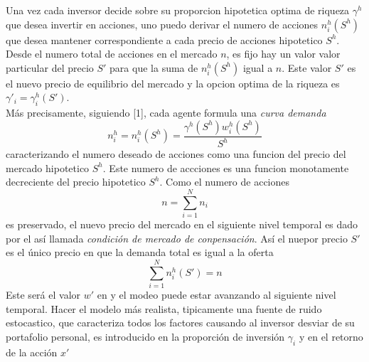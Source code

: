 \documentclass[12pt]{article}
\begin{document}
\quad Una vez cada inversor decide sobre su proporcion hipotetica optima de riqueza $\gamma^{h}$ que desea invertir en acciones, uno puedo derivar el numero de acciones $n^{h}_i(S^{h})$ que desea mantener correspondiente a cada precio de acciones hipotetico $S^{h}$. Desde el numero total de acciones en el mercado $n$, es fijo hay un valor valor particular del precio $S'$ para que la suma de $n^{h}_i(S^h)$ igual a $n$. Este valor $S'$ es el nuevo precio de equilibrio del mercado y la opcion optima de la riqueza es $\gamma'_i=\gamma^{h}_i(S')$.\\
\quad Más precisamente, siguiendo [1], cada agente formula una \textit{ curva demanda}
\begin{equation}
n^h_i=n^h_i(S^h)=\frac{\gamma^h(S^h)w^h_i(S^h)}{S^h}
\end{equation}  
caracterizando el numero deseado de acciones como una funcion del precio del mercado hipotetico $S^h$. Este numero de accciones es una funcion monotamente decreciente del precio hipotetico $S^h$. Como el numero de acciones
\begin{equation}
n= \sum^{N}_{i=1}n_i
\end{equation}
es preservado, el nuevo precio del mercado en el siguiente nivel temporal es dado por el así llamada \textit{condición de mercado de conpensación}. Así el nuepor precio $S'$ es el único precio en que la demanda total es igual a la oferta
\begin{equation}
\sum^{N}_{i=1}n^h_i(S')=n
\end{equation} 
Este será el valor $w'$ en \cite{ec1} y el modeo puede estar avanzando al siguiente nivel temporal. Hacer el modelo más realista, tipicamente una fuente de ruido estocastico, que caracteriza todos los factores causando al inversor desviar de su portafolio personal, es introducido en la proporción de inversión $\gamma_i$ y en el retorno de la acción $x'$ 
\end{document}
